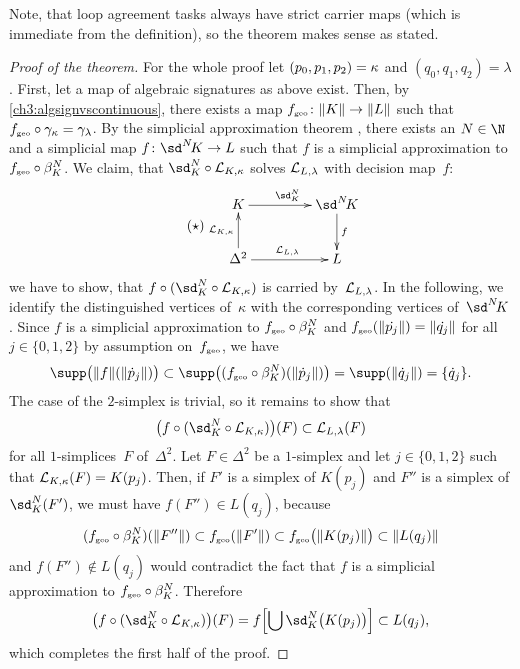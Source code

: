 Note, that loop agreement tasks always have strict carrier maps (which
is immediate from the definition), so the theorem makes sense as stated.

\begin{proof}[Proof of the theorem]
    \newcommand{\sdNkappa}{\sd^N\!\kappa}
    For the whole proof let $(p_0,p_1,p_2) = \kappa$ and $(q_0,q_1,q_2) = \lambda$.
    First, let a map of algebraic signatures as above exist. Then,
    by \cref{ch3:algsignvscontinuous}, there exists a map
    $f_{\scriptscriptstyle\mathrm{geo}}\colon\lVert K\rVert\to\lVert L\rVert$ such that
    $f_\geo\after\gamma_\kappa = \gamma_\lambda$. By the simplicial
    approximation theorem , there exists an $N\in\N$ and a
    simplicial map $f\colon\sdNK \to L$ such that $f$ is a simplicial
    approximation to $f_\geo\after\beta_K^N$.
    We claim, that $\sd_K^N\after\Loop{K,\kappa}$
    solves $\mathcal{L}_{L,\lambda}$ with decision map~$f$:
    \[ \tag{$\star$} \label{ch3:classification:proof:star}
        \begin{gathered}
            \xymatrix@C=1.5cm{
                K \ar[r]^{\sd_K^N} & \sdNK \ar[d]^-f
                \\
                \Delta^2 \ar[u]^-{\Loop{K,\kappa}} \ar[r]^{\Loop{L,\lambda}} & L
            }
        \end{gathered}
    \]
    we have to show, that $f\after(\sd_K^N\after\Loop{K,\kappa})$ is carried
    by~$\mathcal{L}_{L,\lambda}$. In the following, we identify the distinguished
    vertices of~$\kappa$ with the corresponding vertices of~$\sdNK$.
    Since $f$ is a simplicial approximation to
    $f_\geo\after\beta_K^N$ and $f_{\scriptscriptstyle\mathrm{geo}}(\lVert\dot{p_j}\rVert) = \lVert\dot{q_j}\rVert$
    for all $j\in\{0,1,2\}$ by assumption on~$f_{\scriptscriptstyle\mathrm{geo}}$, we have
    \[ \supp\bigl(\geom{f}(\geom{\dot{p}_j})\bigr)
        \subset \supp\bigl( (f_\geo\after\beta_K^N)(\geom{\dot{p}_j}) \bigr)
        = \supp(\geom{\dot{q}_j}) = \{\dot{q}_j\}
    . \]
    The case of the $2$-simplex is trivial, so it remains to show
    that
    \[ \bigl(f\after(\sd_K^N\after\Loop{K,\kappa})\bigr)(F)
        \subset \Loop{L,\lambda}(F)
    \]
    for all $1$-simplices~$F$ of~$\Delta^2$. Let $F\in\Delta^2$ be a $1$-simplex
    and let $j\in\{0,1,2\}$ such that $\mathcal{L}_{K,\kappa}(F) = K(p_j)$. Then, if
    $F'$ is a simplex of $K(p_j)$ and $F''$ is a simplex of $\sd_K^N(F')$, we must have
    $f(F'')\in L(q_j)$, because
    \[ (f_\geo\after\beta_K^N)(\geom{F''}) \subset f_\geo(\geom{F'})
        \subset f_\geo\bigl(\geom{K(p_j)}\bigr) \subset \geom{L(q_j)}
    \]
    and $f(F'')\notin L(q_j)$ would contradict the fact that $f$ is
    a simplicial approximation to $f_\geo\after\beta_K^N$. Therefore
    \[ \bigl(f\after(\sd_K^N\after\Loop{K,\kappa})\bigr)(F)
        = f\Bigl[ \bigcup \sd_K^N\bigl(K(p_j)\bigr) \Bigr]
        \subset L(q_j)
    , \]
    which completes the first half of the proof.
    

\end{proof}
